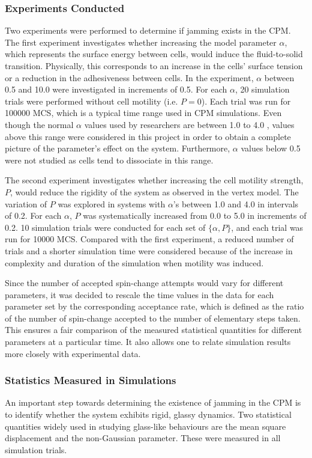 \documentclass[a4paper,12pt]{article}
\begin{document}
\subsubsection{Experiments Conducted}
Two experiments were performed to determine if jamming exists in the CPM. The first experiment investigates whether increasing the model parameter $\alpha$, which represents the surface energy between cells, would induce the fluid-to-solid transition. Physically, this corresponds to an increase in the cells' surface tension or a reduction in the adhesiveness between cells. In the experiment, $\alpha$ between 0.5 and 10.0 were investigated in increments of 0.5. For each $\alpha$, 20 simulation trials were performed without cell motility (i.e. $P = 0$). Each trial was run for 100000 MCS, which is a typical time range used in CPM simulations\cite{kabla2012}. Even though the normal $\alpha$ values used by researchers are between 1.0 to 4.0 \cite{szabo2010}, values above this range were considered in this project in order to obtain a complete picture of the parameter's effect on the system. Furthermore, $\alpha$ values below 0.5 were not studied as cells tend to dissociate in this range. 

The second experiment investigates whether increasing the cell motility strength, $P$, would reduce the rigidity of the system as observed in the vertex model. The variation of $P$ was explored in systems with $\alpha$'s between 1.0 and 4.0 in intervals of 0.2. For each $\alpha$, $P$ was systematically increased from 0.0 to 5.0 in increments of 0.2. 10 simulation trials were conducted for each set of $\{ \alpha, P\}$, and each trial was run for 10000 MCS. Compared with the first experiment, a reduced number of trials and a shorter simulation time were considered because of the increase in complexity and duration of the simulation when motility was induced.  

Since the number of accepted spin-change attempts would vary for different parameters, it was decided to rescale the time values in the data for each parameter set by the corresponding acceptance rate, which is defined as the ratio of the number of spin-change accepted to the number of elementary steps taken. This ensures a fair comparison of the measured statistical quantities for different parameters at a particular time. It also allows one to relate simulation results more closely with experimental data\cite{sanz2010}.


\subsubsection{Statistics Measured in Simulations}
\label{sec:statsmeasured}
An important step towards determining the existence of jamming in the CPM is to identify whether the system exhibits rigid, glassy dynamics. Two statistical quantities widely used in studying glass-like behaviours are the mean square displacement and the non-Gaussian parameter. These were measured in all simulation trials. 
\end{document}
